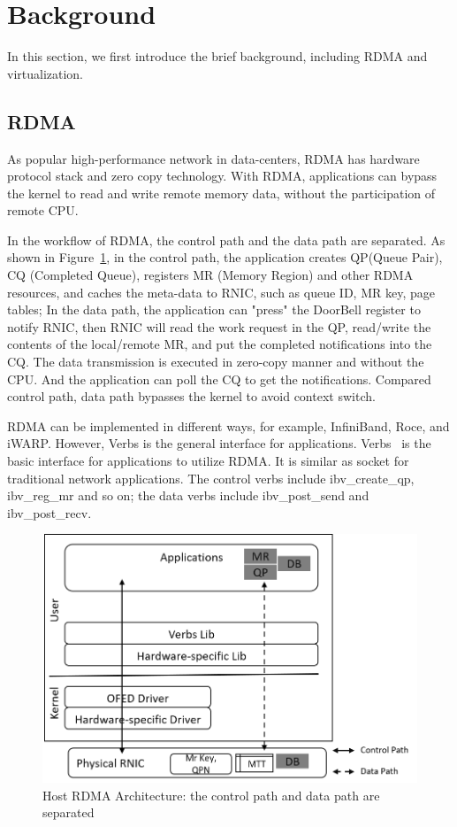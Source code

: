 \section{Background}
In this section, we first introduce the brief background, including RDMA and virtualization. 

\subsection{RDMA}
As popular high-performance network in data-centers, RDMA has hardware protocol stack and zero copy technology. With RDMA, applications can bypass the kernel to read and write remote memory data, without the participation of remote CPU. 


In the workflow of RDMA, the control path and the data path are separated. As shown in Figure~\ref{fig:rdma-feat}, in the control path, the application creates QP(Queue Pair), CQ (Completed Queue), registers MR (Memory Region) and other RDMA resources, and caches the meta-data to RNIC, such as queue ID, MR key, page tables; In the data path, the application can "press"  the DoorBell register to notify RNIC, then RNIC will read the work request in the QP, read/write the contents of the local/remote MR, and put the completed notifications into the CQ. The data transmission is executed in zero-copy manner and without the CPU. And the application can poll the CQ to get the notifications. Compared control path, data path bypasses the kernel to avoid context switch.

RDMA can be implemented in different ways, for example, InfiniBand, Roce, and iWARP. However, Verbs is the general interface for applications. Verbs~\cite{verbs} is the basic interface for applications to utilize RDMA. It is similar as socket for traditional network applications. The control verbs include ibv\_create\_qp, ibv\_reg\_mr and so on; the data verbs include ibv\_post\_send and ibv\_post\_recv. 


\begin{figure}[!ht]
\centering
\includegraphics[width=0.8\linewidth]{images/rdma-feat.png}
\caption{Host RDMA Architecture: the control path and data path are separated}
\label{fig:rdma-feat}
\end{figure}


